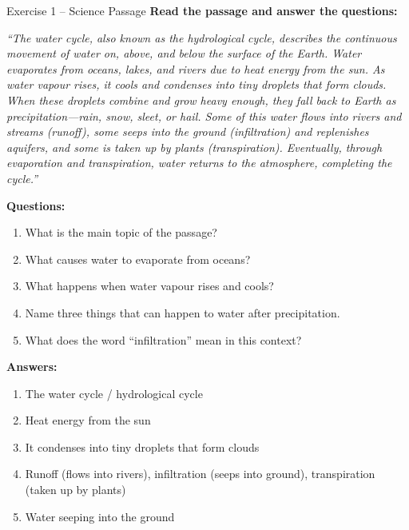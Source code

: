 \documentclass[12pt,a4paper]{article}
\begin{document}
\begin{practicebox}{Exercise 1 -- Science Passage}
\textbf{Read the passage and answer the questions:}

\textit{``The water cycle, also known as the hydrological cycle, describes the continuous movement of water on, above, and below the surface of the Earth. Water evaporates from oceans, lakes, and rivers due to heat energy from the sun. As water vapour rises, it cools and condenses into tiny droplets that form clouds. When these droplets combine and grow heavy enough, they fall back to Earth as precipitation---rain, snow, sleet, or hail. Some of this water flows into rivers and streams (runoff), some seeps into the ground (infiltration) and replenishes aquifers, and some is taken up by plants (transpiration). Eventually, through evaporation and transpiration, water returns to the atmosphere, completing the cycle.''}

\textbf{Questions:}
\begin{enumerate}[noitemsep]
    \item What is the main topic of the passage?
    \item What causes water to evaporate from oceans?
    \item What happens when water vapour rises and cools?
    \item Name three things that can happen to water after precipitation.
    \item What does the word ``infiltration'' mean in this context?
\end{enumerate}

\textbf{Answers:}
\begin{enumerate}[noitemsep]
    \item The water cycle / hydrological cycle
    \item Heat energy from the sun
    \item It condenses into tiny droplets that form clouds
    \item Runoff (flows into rivers), infiltration (seeps into ground), transpiration (taken up by plants)
    \item Water seeping into the ground
\end{enumerate}
\end{practicebox}
\end{document}
